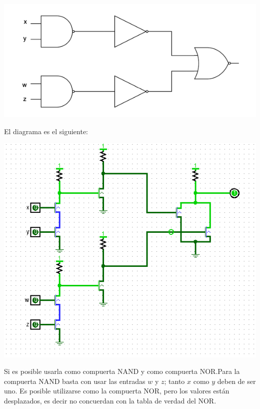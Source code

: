 \documentclass[answers]{exam}
\begin{document}
\begin{questions}
  \begin{center}
    \includegraphics[scale=0.5]{circuito}
  \end{center}
  \begin{solution}
    El diagrama es el siguiente:
    \begin{center}
      \includegraphics[scale=0.8]{ejercicio3}
    \end{center}
  \end{solution}

  \newpage{}

  \begin{solution}
    Si es posible usarla como compuerta NAND y como compuerta NOR.\@ Para la
    compuerta NAND basta con usar las entradas $w$ y $z$; tanto $x$ como $y$
    deben de ser uno. Es posible utilizarse como la compuerta NOR, pero los
    valores están desplazados, es decir no concuerdan con la tabla de verdad del
    NOR.


\end{solution}
\end{questions}
\end{document}
